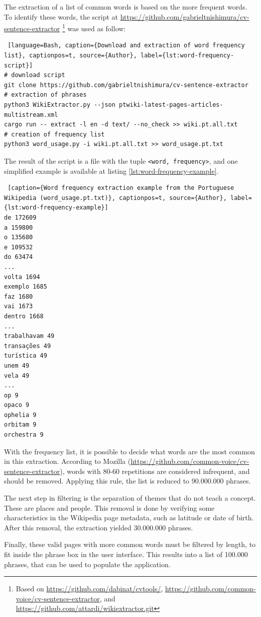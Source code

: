 The extraction of a list of common words is based on the more frequent words. To identify these words, the script at \url{https://github.com/gabrieltnishimura/cv-sentence-extractor} \footnote{Based on \url{https://github.com/dabinat/cvtools/}, \url{https://github.com/common-voice/cv-sentence-extractor}, and \url{https://github.com/attardi/wikiextractor.git}} was used as follow:

\begin{lstlisting} [language=Bash, caption={Download and extraction of word frequency list}, captionpos=t, source={Author}, label={lst:word-frequency-script}]
# download script
git clone https://github.com/gabrieltnishimura/cv-sentence-extractor
# extraction of phrases
python3 WikiExtractor.py --json ptwiki-latest-pages-articles-multistream.xml
cargo run -- extract -l en -d text/ --no_check >> wiki.pt.all.txt
# creation of frequency list
python3 word_usage.py -i wiki.pt.all.txt >> word_usage.pt.txt
\end{lstlisting}

The result of the script is a file with the tuple \texttt{<word, frequency>}, and one simplified example is available at listing \ref{lst:word-frequency-example}.

\begin{lstlisting} [caption={Word frequency extraction example from the Portuguese Wikipedia (word_usage.pt.txt)}, captionpos=t, source={Author}, label={lst:word-frequency-example}]
de 172609
a 159800
o 135680
e 109532
do 63474
...
volta 1694
exemplo 1685
faz 1680
vai 1673
dentro 1668
...
trabalhavam 49
transações 49
turística 49
unem 49
vela 49
...
op 9
opaco 9
ophelia 9
orbitam 9
orchestra 9
\end{lstlisting}

With the frequency list, it is possible to decide what words are the most common in this extraction. According to Mozilla (\url{https://github.com/common-voice/cv-sentence-extractor}), words with 80-60 repetitions are considered infrequent, and should be removed. Applying this rule, the list is reduced to 90.000.000 phrases.

The next step in filtering is the separation of themes that do not teach a concept. These are places and people. This removal is done by verifying some characteristics in the Wikipedia page metadata, such as latitude or date of birth. After this removal, the extraction yielded 30.000.000 phrases.

Finally, these valid pages with more common words must be filtered by length, to fit inside the phrase box in the user interface. This results into a list of 100.000 phrases, that can be used to populate the application.

